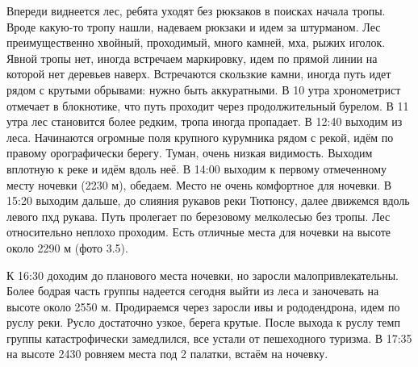 Впереди виднеется лес, ребята уходят без рюкзаков в поисках начала тропы. Вроде какую-то тропу нашли, надеваем рюкзаки и идем за штурманом. Лес преимущественно хвойный, проходимый, много камней, мха, рыжих иголок. Явной тропы нет, иногда встречаем маркировку, идем по прямой линии на которой нет деревьев наверх. Встречаются скользкие камни, иногда путь идет рядом с крутыми обрывами: нужно быть аккуратными. В 10 утра хронометрист отмечает в блокнотике, что путь проходит через продолжительный бурелом. В 11 утра лес становится более редким, тропа иногда пропадает. В 12:40 выходим из леса. Начинаются огромные поля крупного курумника  рядом с рекой, идём по правому орографически берегу. Туман, очень низкая видимость. Выходим вплотную к реке и идём вдоль неё. В 14:00 выходим к первому отмеченному месту ночевки (2230 м), обедаем. Место не очень комфортное для ночевки. В 15:20 выходим дальше, до слияния рукавов реки Тютюнсу, далее движемся вдоль левого пхд рукава. Путь пролегает по березовому мелколесью без тропы. Лес относительно неплохо проходим. Есть отличные места для ночевки на высоте около 2290 м (фото 3.5).

К 16:30 доходим до планового места ночевки, но заросли малопривлекательны. Более бодрая часть группы надеется сегодня выйти из леса и заночевать на высоте около 2550 м. Продираемся через заросли ивы и рододендрона, идем по руслу реки. Русло достаточно узкое, берега крутые. После выхода к руслу темп группы катастрофически замедлился, все устали от пешеходного туризма. В 17:35 на высоте 2430 ровняем места под 2 палатки, встаём на ночевку.
















    \FloatBarrier
